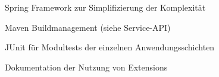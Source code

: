 \begin{frame}
\begin{block}{}
	Spring Framework zur Simplifizierung der Komplexität
\end{block}
\begin{block}{}
	Maven Buildmanagement (siehe Service-API)
\end{block}
\begin{block}{}
	JUnit für Modultests der einzelnen Anwendungsschichten
\end{block}
\begin{block}{}
	Dokumentation der Nutzung von Extensions
\end{block}
\end{frame}